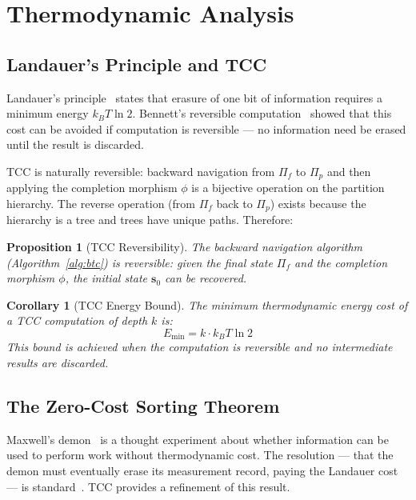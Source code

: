 \documentclass[12pt,twocolumn]{article}
\newtheorem{corollary}[theorem]{Corollary}
\newtheorem{proposition}[theorem]{Proposition}
\begin{document}
\section{Thermodynamic Analysis}
\label{sec:thermodynamics}

\subsection{Landauer's Principle and TCC}

Landauer's principle~\cite{landauer1961irreversibility} states that erasure of one bit of information requires a minimum energy $k_B T \ln 2$. Bennett's reversible computation~\cite{bennett1973logical} showed that this cost can be avoided if computation is reversible --- no information need be erased until the result is discarded.

TCC is naturally reversible: backward navigation from $\Pi_f$ to $\Pi_p$ and then applying the completion morphism $\phi$ is a bijective operation on the partition hierarchy. The reverse operation (from $\Pi_f$ back to $\Pi_p$) exists because the hierarchy is a tree and trees have unique paths. Therefore:

\begin{proposition}[TCC Reversibility]
The backward navigation algorithm (Algorithm~\ref{alg:btc}) is reversible: given the final state $\Pi_f$ and the completion morphism $\phi$, the initial state $\mathbf{s}_0$ can be recovered.
\end{proposition}

\begin{corollary}[TCC Energy Bound]
The minimum thermodynamic energy cost of a TCC computation of depth $k$ is:
\begin{equation}
E_{\min} = k \cdot k_B T \ln 2
\end{equation}
This bound is achieved when the computation is reversible and no intermediate results are discarded.
\end{corollary}

\subsection{The Zero-Cost Sorting Theorem}

Maxwell's demon~\cite{maxwell1871theory,leff1990maxwell} is a thought experiment about whether information can be used to perform work without thermodynamic cost. The resolution --- that the demon must eventually erase its measurement record, paying the Landauer cost --- is standard~\cite{bennett1982thermodynamics}. TCC provides a refinement of this result.
\end{document}
